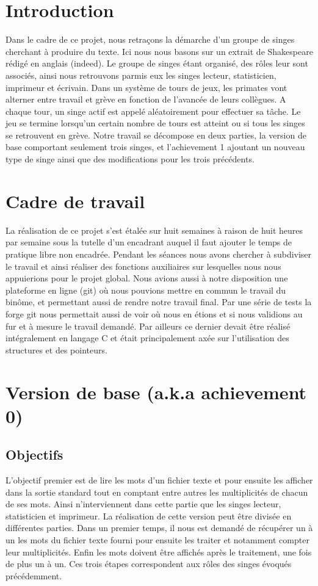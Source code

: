 \documentclass[12pt]{article}
\begin{document}
\tableofcontents
\newpage

\section*{Introduction}

\textnormal{Dans le cadre de ce projet, nous retraçons la démarche d'un groupe de singes cherchant à produire du texte. Ici nous nous basons sur un extrait de Shakespeare rédigé en anglais (indeed). Le groupe de singes étant organisé, des rôles leur sont associés, ainsi nous retrouvons parmis eux les singes lecteur, statisticien, imprimeur et écrivain.
Dans un système de tours de jeux, les primates vont alterner entre travail et grève en fonction de l'avancée de leurs collègues. A chaque tour, un singe actif est appelé aléatoirement pour effectuer sa tâche. Le jeu se termine lorsqu'un certain nombre de tours est atteint ou si tous les singes se retrouvent en grève. Notre travail se décompose en deux parties, la version de base comportant seulement trois singes, et l'achievement 1 ajoutant un nouveau type de singe ainsi que des modifications pour les trois précédents.
}

\section*{Cadre de travail}
La réalisation de ce projet s'est étalée sur huit semaines à raison de huit heures par semaine sous la tutelle d'un encadrant auquel il faut ajouter le temps de pratique libre non encadrée. Pendant les séances nous avons chercher à subdiviser le travail et ainsi réaliser des fonctions auxiliaires sur lesquelles nous nous appuierions pour le projet global. Nous avions aussi à notre disposition une plateforme en ligne (git) où nous pouvions mettre en commun le travail du binôme, et permettant aussi de rendre notre travail final. Par une série de tests la forge git nous permettait aussi de voir où nous en étions et si nous validions au fur et à mesure le travail demandé. Par ailleurs ce dernier devait être réalisé intégralement en langage C et était principalement axée sur l'utilisation des structures et des pointeurs.

\newpage
\section{Version de base (a.k.a achievement 0)}
\subsection{Objectifs}
L'objectif premier est de lire les mots d'un fichier texte et pour ensuite les afficher dans la sortie standard tout en comptant entre autres les multiplicités de chacun de ses mots.
Ainsi n'interviennent dans cette partie que les singes lecteur, statisticien et imprimeur. La réalisation de cette version peut être divisée en différentes parties. Dans un premier temps, il nous est demandé de récupérer un à un les mots du fichier texte fourni pour ensuite les traiter et notamment compter leur multiplicités. Enfin les mots doivent être affichés après le traitement, une fois de plus un à un. Ces trois étapes correspondent aux rôles des singes évoqués précédemment. 
\end{document}
